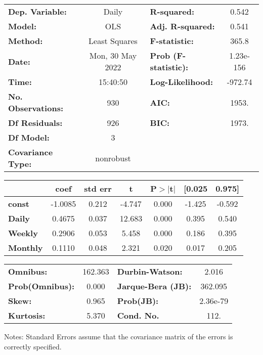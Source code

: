 \begin{center}
\begin{tabular}{lclc}
\toprule
\textbf{Dep. Variable:}    &      Daily       & \textbf{  R-squared:         } &     0.542   \\
\textbf{Model:}            &       OLS        & \textbf{  Adj. R-squared:    } &     0.541   \\
\textbf{Method:}           &  Least Squares   & \textbf{  F-statistic:       } &     365.8   \\
\textbf{Date:}             & Mon, 30 May 2022 & \textbf{  Prob (F-statistic):} & 1.23e-156   \\
\textbf{Time:}             &     15:40:50     & \textbf{  Log-Likelihood:    } &   -972.74   \\
\textbf{No. Observations:} &         930      & \textbf{  AIC:               } &     1953.   \\
\textbf{Df Residuals:}     &         926      & \textbf{  BIC:               } &     1973.   \\
\textbf{Df Model:}         &           3      & \textbf{                     } &             \\
\textbf{Covariance Type:}  &    nonrobust     & \textbf{                     } &             \\
\bottomrule
\end{tabular}
\begin{tabular}{lcccccc}
                 & \textbf{coef} & \textbf{std err} & \textbf{t} & \textbf{P$> |$t$|$} & \textbf{[0.025} & \textbf{0.975]}  \\
\midrule
\textbf{const}   &      -1.0085  &        0.212     &    -4.747  &         0.000        &       -1.425    &       -0.592     \\
\textbf{Daily}   &       0.4675  &        0.037     &    12.683  &         0.000        &        0.395    &        0.540     \\
\textbf{Weekly}  &       0.2906  &        0.053     &     5.458  &         0.000        &        0.186    &        0.395     \\
\textbf{Monthly} &       0.1110  &        0.048     &     2.321  &         0.020        &        0.017    &        0.205     \\
\bottomrule
\end{tabular}
\begin{tabular}{lclc}
\textbf{Omnibus:}       & 162.363 & \textbf{  Durbin-Watson:     } &    2.016  \\
\textbf{Prob(Omnibus):} &   0.000 & \textbf{  Jarque-Bera (JB):  } &  362.095  \\
\textbf{Skew:}          &   0.965 & \textbf{  Prob(JB):          } & 2.36e-79  \\
\textbf{Kurtosis:}      &   5.370 & \textbf{  Cond. No.          } &     112.  \\
\bottomrule
\end{tabular}
\end{center}

Notes: \newline
 [1] Standard Errors assume that the covariance matrix of the errors is correctly specified.